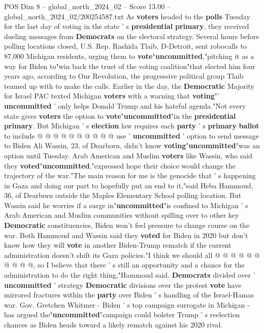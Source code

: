 \begin{textsample}{POS Dim 8 – global\_north\_2024\_02 – Score 13.00 – global\_north\_2024\_02/200254587.txt}
As \textbf{voters} headed to the \textbf{polls} Tuesday for the last day of voting in the state ' s \textbf{presidential} \textbf{primary}, they received dueling messages from \textbf{Democrats} on the electoral strategy.
Several hours before polling locations closed, U.S.
Rep.
Rashida Tlaib, D-Detroit, sent robocalls to 87,000 Michigan residents, urging them to \textbf{vote}"\textbf{uncommitted},"pitching it as a way for Biden to"win back the trust of the voting coalition"that elected him four years ago, according to Our Revolution, the progressive political group Tlaib teamed up with to make the calls.
Earlier in the day, the \textbf{Democratic} Majority for Israel PAC texted Michigan \textbf{voters} with a warning that \textbf{voting}"' \textbf{uncommitted} ' only helps Donald Trump and his hateful agenda."Not every state gives \textbf{voters} the option to \textbf{vote}"\textbf{uncommitted}"in the \textbf{presidential} \textbf{primary}.
But Michigan ' s \textbf{election} law requires each \textbf{party} ' s \textbf{primary} \textbf{ballot} to include @ @ @ @ @ @ @ @ @ @ use ' \textbf{uncommitted} ' option to send message to Biden Ali Wassin, 23, of Dearborn, didn't know \textbf{voting}"\textbf{uncommitted}"was an option until Tuesday.
Arab American and Muslim \textbf{voters} like Wassin, who said they \textbf{voted}"\textbf{uncommitted},"expressed hope their choice would change the trajectory of the war."The main reason for me is the genocide that ' s happening in Gaza and doing our part to hopefully put an end to it,"said Heba Hammoud, 36, of Dearborn outside the Maples Elementary School polling location.
But Wassin said he worries if a surge in"\textbf{uncommitted}"is confined to Michigan ' s Arab American and Muslim communities without spilling over to other key \textbf{Democratic} constituencies, Biden won't feel pressure to change course on the war.
Both Hammoud and Wassin said they \textbf{voted} for Biden in 2020 but don't know how they will \textbf{vote} in another Biden-Trump rematch if the current administration doesn't shift its Gaza policies."I think we should all @ @ @ @ @ @ @ @ @ @, so I believe that there ' s still an opportunity and a chance for the administration to do the right thing,"Hammoud said. \textbf{Democrats} divided over ' \textbf{uncommitted} ' strategy \textbf{Democratic} divisions over the protest \textbf{vote} have mirrored fractures within the \textbf{party} over Biden ' s handling of the Israel-Hamas war.
Gov.
Gretchen Whitmer - Biden ' s top campaign surrogate in Michigan - has argued the"\textbf{uncommitted}"campaign could bolster Trump ' s reelection chances as Biden heads toward a likely rematch against his 2020 rival.

\end{textsample}
